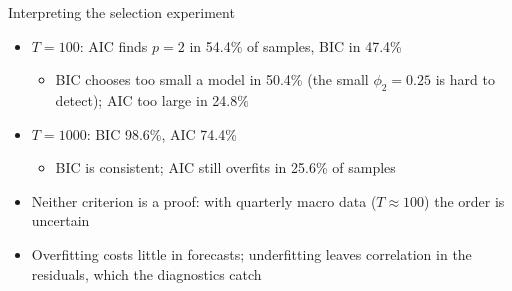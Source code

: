 \begin{frame}{Interpreting the selection experiment}
\itemsize{\small}
\begin{itemize}
    \item $T = 100$: AIC finds $p = 2$ in 54.4\% of samples, BIC in 47.4\%
    \begin{itemize}
        \item BIC chooses too small a model in 50.4\% (the small $\phi_2 = 0.25$ is hard to detect); AIC too large in 24.8\%
    \end{itemize}
    \item $T = 1000$: BIC 98.6\%, AIC 74.4\%
    \begin{itemize}
        \item BIC is consistent; AIC still overfits in 25.6\% of samples
    \end{itemize}
    \item Neither criterion is a proof: with quarterly macro data ($T \approx 100$) the order is uncertain
    \item Overfitting costs little in forecasts; underfitting leaves correlation in the residuals, which the diagnostics catch
\end{itemize}
\end{frame}

